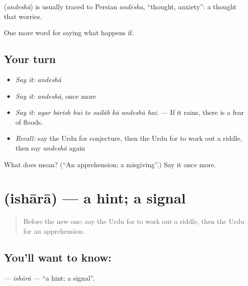 \begin{cousinweb}
\textbf{} (\emph{andeshā}) is usually traced to Persian \emph{andēsha}, \textquotedblleft{}thought, anxiety\textquotedblright{}: a thought that worries.
\end{cousinweb}

\begin{grammarlens}[title={What you've built}]
One more word for saying what happens if.
\end{grammarlens}

\subsection*{Your turn}
\begin{itemize}
\raggedright
  \item \emph{Say it:} \emph{andeshā}
  \item \emph{Say it:} \emph{andeshā}, once more
  \item \emph{Say it:} \emph{agar bārish huī to sailāb kā andeshā hai.} — If it rains, there is a fear of floods.
  \item \emph{Recall:} say the Urdu for conjecture, then the Urdu for to work out a riddle, then say \emph{andeshā} again
\end{itemize}

\begin{tcolorbox}[breakable,colback=teal!4,colframe=teal!35!black,title={Before you move on}]
What does  mean? (\textquotedblleft{}An apprehension; a misgiving\textquotedblright{}.) Say it once more.
\end{tcolorbox}
\section[\texorpdfstring{\ur{اشارہ} (ishārā)}{اشارہ (ishārā)}]{ (ishārā) — a hint; a signal}

\label{lesson:UR-C363-ishara}



\begin{quote}
Before the new one: say the Urdu for to work out a riddle, then the Urdu for an apprehension.
\end{quote}

\subsection*{You'll want to know: }
\textbf{} — \emph{ishārā} — \textquotedblleft{}a hint; a signal\textquotedblright{}.

